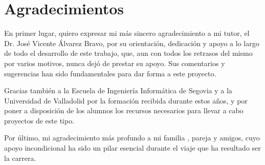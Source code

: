 \chapter*{Agradecimientos}

En primer lugar, quiero expresar mi más sincero agradecimiento a mi tutor, el Dr. José Vicente Álvarez Bravo, por su orientación, dedicación y apoyo a lo largo de todo el desarrollo de este trabajo, que, aun con todos los retrasos del mismo por varios motivos, nunca dejó de prestar su apoyo. Sus comentarios y sugerencias han sido fundamentales para dar forma a este proyecto.

Gracias también a la Escuela de Ingeniería Informática de Segovia y a la Universidad de Valladolid por la formación recibida durante estos años, y por poner a disposición de los alumnos los recursos necesarios para llevar a cabo proyectos de este tipo.

Por último, mi agradecimiento más profundo a mi familia , pareja y amigos, cuyo apoyo incondicional ha sido un pilar esencial durante el viaje que ha resultado ser la carrera.

